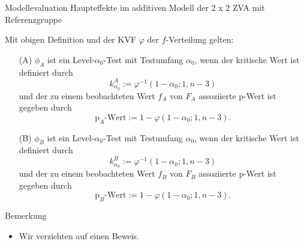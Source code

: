 \documentclass[
  8pt,
  ignorenonframetext,
]{beamer}
\providecommand{\tightlist}{%
  \setlength{\itemsep}{0pt}\setlength{\parskip}{0pt}}
\begin{document}
\begin{frame}{\small Modellevaluation \textbar{} Haupteffekte im
additiven Modell der 2 x 2 ZVA mit Referenzgruppe}
\protect\hypertarget{modellevaluation-haupteffekte-im-additiven-modell-der-2-x-2-zva-mit-referenzgruppe-2}{}
\footnotesize
\begin{theorem}
\justifying
\normalfont
Mit obigen Definition und der KVF $\varphi$ der $f$-Verteilung gelten:
\begin{itemize}
\item[(A)] $\phi_A$ ist ein Level-$\alpha_0$-Test mit Testumfang $\alpha_0$, wenn der
kritische Wert ist definiert durch
\begin{equation}
k_{\alpha_0}^A := \varphi^{-1}(1-\alpha_0; 1,n-3)
\end{equation}
und der zu einem beobachteten Wert $f_A$ von $F_A$ assoziierte p-Wert ist gegeben durch
\begin{equation}
\mbox{p}_A\mbox{-Wert} := 1 - \varphi(1-\alpha_0; 1,n-3).
\end{equation}
\item[(B)] $\phi_B$ ist ein Level-$\alpha_0$-Test mit Testumfang $\alpha_0$, wenn der
kritische Wert ist definiert durch
\begin{equation}
k_{\alpha_0}^B := \varphi^{-1}(1-\alpha_0; 1,n-3)
\end{equation}
und der zu einem beobachteten Wert $f_B$ von $F_B$ assoziierte p-Wert ist gegeben durch
\begin{equation}
\mbox{p}_B\mbox{-Wert} := 1 - \varphi(1-\alpha_0; 1,n-3).
\end{equation}
\end{itemize}
\end{theorem}

Bemerkung

\begin{itemize}
\tightlist
\item
  Wir verzichten auf einen Beweis.
\end{itemize}
\end{frame}
\end{document}
